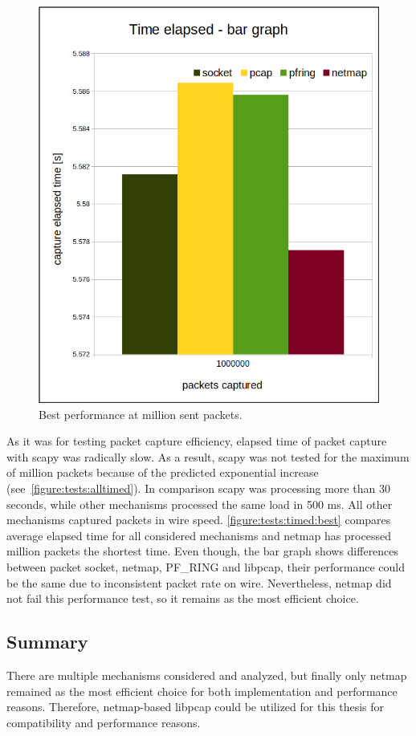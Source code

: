 \documentclass[12pt,a4paper,twoside]{report}
\begin{document}
				\begin{figure}[h]
					\centering
					\includegraphics[scale=0.4]{speed_bar-graph}
					\caption{Best performance at million sent packets.}
					\label{figure:tests:timed:best}
				\end{figure}
				As it was for testing packet capture efficiency, elapsed time of packet capture with scapy was radically slow. As a result, scapy was not tested for the maximum of million packets because of the predicted exponential increase (see~\autoref{figure:tests:alltimed}). In comparison scapy was processing more than 30 seconds, while other mechanisms processed the same load in 500 ms. All other mechanisms captured packets in wire speed. \autoref{figure:tests:timed:best} compares average elapsed time for all considered mechanisms and netmap has processed million packets the shortest time. Even though, the bar graph shows differences between packet socket, netmap, PF\_RING and libpcap, their performance could be the same due to inconsistent packet rate on wire. Nevertheless, netmap did not fail this performance test, so it remains as the most efficient choice.
				
		\subsection{Summary} \label{analysis:mechs:final}
			There are multiple mechanisms considered and analyzed, but finally only netmap remained as the most efficient choice for both implementation and performance reasons. Therefore, netmap-based libpcap could be utilized for this thesis for compatibility and performance reasons.
\end{document}
